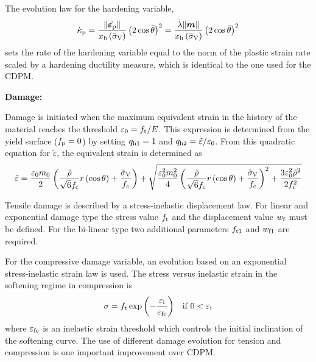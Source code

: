 \documentclass[a4paper]{article}
\newcommand{\mbf}[1]{\mbox{\boldmath$#1$}}
\newcommand{\veps}{\mbf{\varepsilon}}  %
\begin{document}
The evolution law for the hardening variable,
\begin{equation}
\dot{\kappa}_{\rm {p}} = \frac {\| \dot{\veps_{\rm{p}}}\|}{x_{\rm{h}}\left(\bar{\sigma}_{\rm V} \right)} \left(2 \cos{\bar{\theta}}\right)^2 = \frac {\dot{\lambda} \| \mbf{m}\|}{x_{\rm{h}}\left(\bar{\sigma}_{\rm V} \right)} \left(2\cos{\bar{\theta}}\right)^2
\end{equation}
sets the rate of the hardening variable equal to the norm of the plastic strain rate scaled by a hardening ductility measure, which is identical to the one used for the CDPM.

\noindent\textbf{Damage:}

Damage is initiated when the maximum equivalent strain in the history of the material reaches the threshold $\varepsilon_{0} = f_{\rm t}/E$. 
This expression is determined from the yield surface ($f_{\rm p} = 0$) by setting $q_{\rm {h1}}=1$ and $q_{\rm{h2}} = \tilde{\varepsilon}/\varepsilon_{0}$.
From this quadratic equation for $\tilde{\varepsilon}$, the equivalent strain is determined as
\begin{equation}
\tilde{\varepsilon} = \dfrac{\varepsilon_0 m_0}{2}  \left(\dfrac{\bar{\rho}}{\sqrt{6} f_{\rm c}} r\left(\cos\theta\right) + \dfrac{\bar{\sigma}_{\rm V}}{f_{c}}\right) + \sqrt{\dfrac{\varepsilon_0^2 m_0^2}{4} \left(\dfrac{\bar{\rho}}{\sqrt{6}f_{\rm c}} r\left(\cos\theta\right) + \dfrac{\bar{\sigma}_{\rm V}}{f_{\rm c}}\right)^2 + \dfrac{3 \varepsilon_0^2 \bar{\rho}^2}{2 f_{\rm c}^2}}
\end{equation}

Tensile damage is described by a stress-inelastic displacement law. For linear and exponential damage type the stress value $f_{\rm t}$ and the displacement value $w_{\rm f}$ must be defined. For the bi-linear type two additional parameters $f_{\rm t1}$ and  $w_{\rm f1}$ are required.
 
For the compressive damage variable, an evolution based on an exponential stress-inelastic strain law is used. The stress versus inelastic strain in the softening regime in compression is
\begin{equation}
\begin{array}{ll}
\sigma = f_{\rm t} \exp\left(-\dfrac{\varepsilon_{\rm i}}{\varepsilon_{\rm fc}}\right) & \mbox{if $0 < \varepsilon_{\rm i}$}
\end{array}
\end{equation}
where $\varepsilon_{\rm fc}$ is an inelastic strain threshold which controls the initial inclination of the softening curve. The use of different damage evolution for tension and compression is one important improvement over CDPM.
\end{document}
